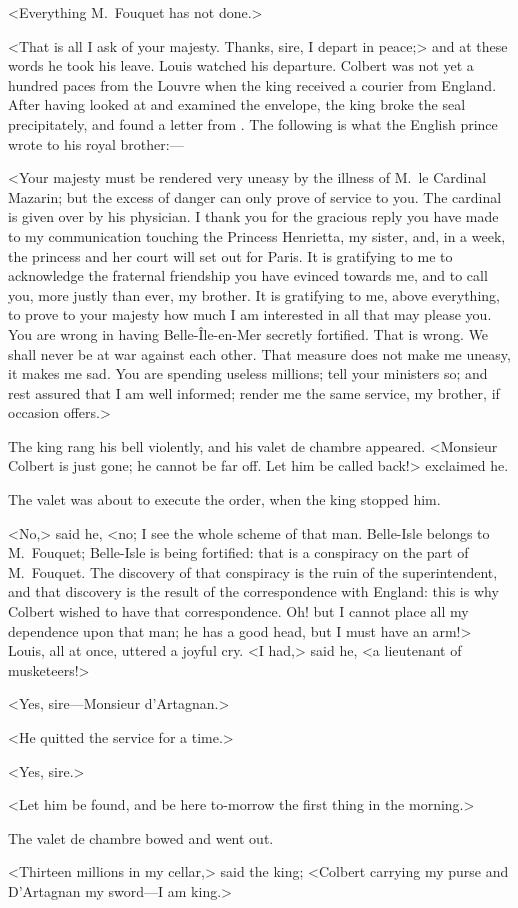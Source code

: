 <Everything M.~Fouquet has not done.>

<That is all I ask of your majesty. Thanks, sire, I depart in peace;> and at these words he took his leave. Louis watched his departure. Colbert was not yet a hundred paces from the Louvre when the king received a courier from England. After having looked at and examined the envelope, the king broke the seal precipitately, and found a letter from . The following is what the English prince wrote to his royal brother:—

<Your majesty must be rendered very uneasy by the illness of M.~le Cardinal Mazarin; but the excess of danger can only prove of service to you. The cardinal is given over by his physician. I thank you for the gracious reply you have made to my communication touching the Princess Henrietta, my sister, and, in a week, the princess and her court will set out for Paris. It is gratifying to me to acknowledge the fraternal friendship you have evinced towards me, and to call you, more justly than ever, my brother. It is gratifying to me, above everything, to prove to your majesty how much I am interested in all that may please you. You are wrong in having Belle-Île-en-Mer secretly fortified. That is wrong. We shall never be at war against each other. That measure does not make me uneasy, it makes me sad. You are spending useless millions; tell your ministers so; and rest assured that I am well informed; render me the same service, my brother, if occasion offers.>

The king rang his bell violently, and his valet de chambre appeared. <Monsieur Colbert is just gone; he cannot be far off. Let him be called back!> exclaimed he.

The valet was about to execute the order, when the king stopped him.

<No,> said he, <no; I see the whole scheme of that man. Belle-Isle belongs to M.~Fouquet; Belle-Isle is being fortified: that is a conspiracy on the part of M.~Fouquet. The discovery of that conspiracy is the ruin of the superintendent, and that discovery is the result of the correspondence with England: this is why Colbert wished to have that correspondence. Oh! but I cannot place all my dependence upon that man; he has a good head, but I must have an arm!> Louis, all at once, uttered a joyful cry. <I had,> said he, <a lieutenant of musketeers!>

<Yes, sire—Monsieur d'Artagnan.>

<He quitted the service for a time.>

<Yes, sire.>

<Let him be found, and be here to-morrow the first thing in the morning.>

The valet de chambre bowed and went out.

<Thirteen millions in my cellar,> said the king; <Colbert carrying my purse and D'Artagnan my sword—I am king.> 